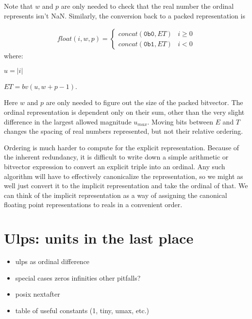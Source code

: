 \documentclass[letterpaper,10pt]{article}
\begin{document}
Note that $w$ and $p$ are only needed to check that the real number the ordinal represents isn't NaN. Similarly, the conversion back to a packed representation is

\begin{align} \label{eq:ord4}
 float(i, w, p) = 
 \begin{cases}
  concat(\texttt{0b0}, ET) & i \geq 0 \\
  concat(\texttt{0b1}, ET) & i < 0
 \end{cases}
\end{align}
where:
\begin{description}
 \item $u = \lvert i \rvert$
 \item $ET = bv(u, w + p - 1)$.
\end{description}

Here $w$ and $p$ are only needed to figure out the size of the packed bitvector. The ordinal representation is dependent only on their sum, other than the very slight difference in the largest allowed magnitude $u_{max}$. Moving bits between $E$ and $T$ changes the spacing of real numbers represented, but not their relative ordering.

Ordering is much harder to compute for the explicit representation. Because of the inherent redundancy, it is difficult to write down a simple arithmetic or bitvector expression to convert an explicit triple into an ordinal. Any such algorithm will have to effectively canonicalize the representation, so we might as well just convert it to the implicit representation and take the ordinal of that. We can think of the implicit representation as a way of assigning the canonical floating point representations to reals in a convenient order.

\section{Ulps: units in the last place}

\begin{itemize}
 \item ulps as ordinal difference
 \item special cases
 \subitem zeros
 \subitem infinities
 \subitem other pitfalls?
 \item posix nextafter
 \item table of useful constants (1, tiny, umax, etc.)
\end{itemize}



\end{document}
